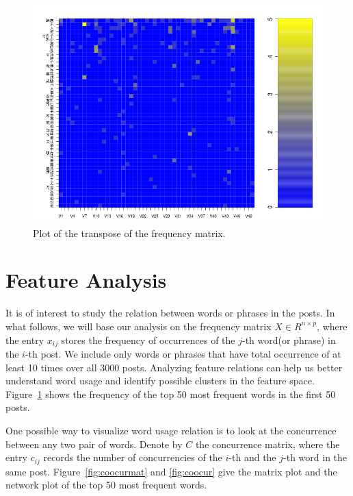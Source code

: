 \documentclass[11pt]{article}
\newcommand{\1}[1]{{\mathbf 1}\left\{#1\right\}}        %
\begin{document}
\begin{center}
\begin{figure}[tb]
   \centering
   \includegraphics[width=\textwidth]{../wordFreqMat.png} 
      \caption{Plot of the transpose of the frequency matrix.}
   \label{fig:freqmat}
\end{figure}
\end{center}


\section{Feature Analysis}
It is of interest to study the relation between words or phrases in the posts. In what follows, we will base our analysis on the frequency matrix $X\in R^{n\times p}$, where the entry $x_{ij}$ stores the frequency of occurrences of the $j$-th word(or phrase) in the $i$-th post. We include only words or phrases that have total occurrence of at least 10 times over all 3000 posts. Analyzing feature relations can help us better understand word usage and identify possible clusters in the feature space.  Figure~\ref{fig:freqmat} shows the frequency of the top 50 most frequent words in the first 50 posts.


One possible way to visualize word usage relation is to look at the concurrence between any two pair of words. Denote by $C$ the concurrence matrix, where the entry $c_{ij}$ records the number of concurrencies of the $i$-th and the $j$-th word in the same post. Figure~\ref{fig:coocurmat} and \ref{fig:coocur} give the matrix plot and the network plot of the top 50 most frequent words. 
\end{document}
